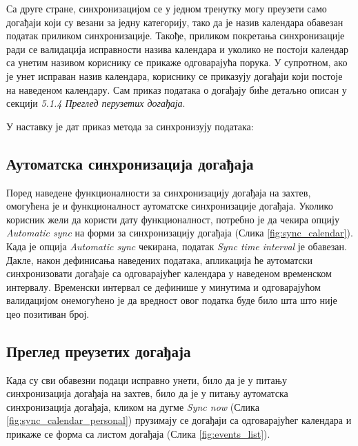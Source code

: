 Са друге стране, синхронизацијом се у једном тренутку могу преузети само догађаји који су везани за једну категорију, тако да је назив календара обавезан податак приликом синхронизације. Такође, приликом покретања синхронизације ради се валидација исправности назива календара и уколико не постоји календар са унетим називом кориснику се прикаже одговарајућа порука. У супротном, ако је унет исправан назив календара, кориснику се приказују догађаји који постоје на наведеном календару. Сам приказ података о догађају биће детаљно описан у секцији \textit{5.1.4 Преглед перузетих догађаја}.

У наставку је дат приказ метода за синхронизују података:


\subsection{Аутоматска синхронизација догађаја}

Поред наведене функционалности за синхронизацију догађаја на захтев, омогућена је и функционалност аутоматске синхронизације догађаја. Уколико корисник жели да користи дату функционалност, потребно је да чекира опцију \textit{Automatic sync} на форми за синхронизацију догађаја (Слика \ref{fig:sync_calendar}). Када је опција \textit{Automatic sync} чекирана, податак \textit{Sync time interval} је обавезан. Дакле, након дефинисања наведених података, апликација ће аутоматски синхронизовати догађаје са одговарајућег календара у наведеном временском интервалу. Временски интервал се дефинише у минутима и одговарајућом валидацијом онемогућено је да вредност овог податка буде било шта што није цео позитиван број.

\subsection{Преглед преузетих догађаја}
Када су сви обавезни подаци исправно унети, било да је у питању синхронизација догађаја на захтев, било да је у питању аутоматска синхронизација догађаја, кликом на дугме \textit{Sync now} (Слика \ref{fig:sync_calendar_personal}) прузимају се догађаји са одговарајућег календара и прикаже се форма са листом догађаја (Слика \ref{fig:events_list}).

